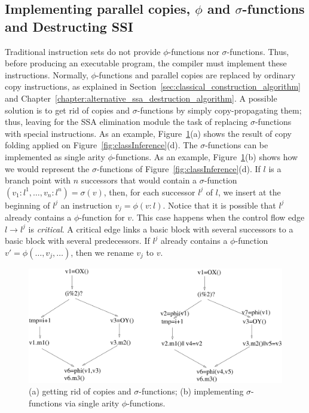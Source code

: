 \subsection{Implementing parallel copies, $\phi$ and $\sigma$-functions and Destructing SSI}
\label{sub:special}
Traditional instruction sets do not provide $\phi$-functions nor $\sigma$-functions.
Thus, before producing an executable program, the compiler must implement these instructions.
Normally, $\phi$-functions and parallel copies are replaced by ordinary copy instructions, as explained in Section~\ref{sec:classical_construction_algorithm} and Chapter~\ref{chapter:alternative_ssa_destruction_algorithm}.
A possible solution is to get rid of copies and $\sigma$-functions by simply copy-propagating them; thus, leaving for the SSA elimination module the task of replacing $\sigma$-functions with special instructions.
As an example, Figure~\ref{fig:sigImpl}(a) shows the result of copy folding applied on Figure~\ref{fig:classInference}(d). 
The $\sigma$-functions can be implemented as single arity $\phi$-functions.
As an example, Figure~\ref{fig:sigImpl}(b) shows how we would represent the $\sigma$-functions of Figure~\ref{fig:classInference}(d). 
If $l$ is a branch point with $n$ successors that would contain a $\sigma$-function $(v_1:l^1, \ldots, v_n:l^n) =\sigma(v)$, then, for each successor $l^j$ of $l$, we insert at the beginning of $l^j$ an instruction $v_j = \phi(v:l)$.
Notice that it is possible that $l^j$ already contains a $\phi$-function for $v$.
This case happens when the control flow edge $l \rightarrow l^j$ is {\em critical}.
A critical edge links a basic block with several successors to a basic block with several predecessors.
If $l^j$ already contains a $\phi$-function $v' = \phi(\ldots, v_j, \ldots)$, then we rename $v_j$ to $v$.


\begin{figure}[t!]
\centering
\includegraphics[width=\textwidth]{sigImpl}
\caption{(a) getting rid of copies and $\sigma$-functions; (b) implementing $\sigma$-functions via single arity $\phi$-functions.}
\label{fig:sigImpl}
\end{figure}



